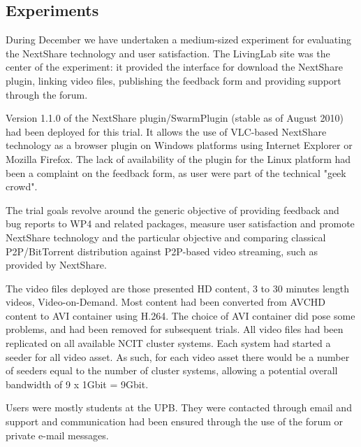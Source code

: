 \subsection{Experiments}
\label{subsec:multimedia-dist:evaluation-december-2010}

During December we have undertaken a
medium-sized experiment for evaluating the NextShare technology and user
satisfaction. The LivingLab site was the center of the experiment: it
provided the interface for download the NextShare plugin, linking video files,
publishing the feedback form and providing support through the forum.

Version 1.1.0 of the NextShare plugin/SwarmPlugin (stable as of August 2010)
had been deployed for this trial. It allows the use of VLC-based NextShare
technology as a browser plugin on Windows platforms using Internet Explorer or
Mozilla Firefox. The lack of availability of the plugin for the Linux platform
had been a complaint on the feedback form, as user were part of the technical
"geek crowd".

The trial goals revolve around the generic objective of providing feedback and
bug reports to WP4 and related packages, measure user satisfaction and promote
NextShare technology and the particular objective and comparing classical
P2P/BitTorrent distribution against P2P-based video streaming, such as
provided by NextShare.

The video files deployed are those presented HD content, 3 to 30 minutes
length videos, Video-on-Demand. Most content had been converted from AVCHD
content to AVI container using H.264. The choice of AVI container did pose
some problems, and had been removed for
subsequent trials. All video files had been replicated on all available NCIT
cluster systems. Each system had started a seeder for all video asset. As
such, for each video asset there would be a number of seeders equal to the
number of cluster systems, allowing a potential overall bandwidth of 9 x 1Gbit
= 9Gbit.

Users were mostly students at the UPB. They were contacted through email and
support and communication had been ensured through the use of the forum or
private e-mail messages.

